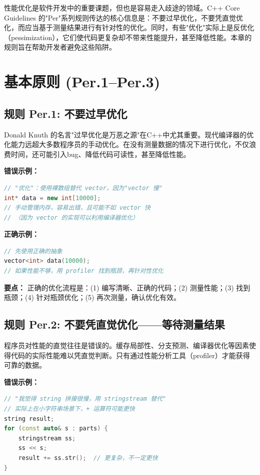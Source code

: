 性能优化是软件开发中的重要课题，但也是容易走入歧途的领域。C++ Core Guidelines 的"Per"系列规则传达的核心信息是：不要过早优化，不要凭直觉优化，而应当基于测量结果进行有针对性的优化。同时，有些"优化"实际上是反优化（pessimization），它们使代码更复杂却不带来性能提升，甚至降低性能。本章的规则旨在帮助开发者避免这些陷阱。

\section{基本原则 (Per.1--Per.3)}

\subsection*{\textbf{规则 Per.1:} 不要过早优化}

Donald Knuth 的名言"过早优化是万恶之源"在C++中尤其重要。现代编译器的优化能力远超大多数程序员的手动优化。在没有测量数据的情况下进行优化，不仅浪费时间，还可能引入bug、降低代码可读性，甚至降低性能。

\textbf{错误示例：}

\begin{lstlisting}[language=C++]
// "优化"：使用裸数组替代 vector，因为"vector 慢"
int* data = new int[10000];
// 手动管理内存，容易出错，且可能不如 vector 快
// （因为 vector 的实现可以利用编译器优化）
\end{lstlisting}

\textbf{正确示例：}

\begin{lstlisting}[language=C++]
// 先使用正确的抽象
vector<int> data(10000);
// 如果性能不够，用 profiler 找到瓶颈，再针对性优化
\end{lstlisting}

\textbf{要点：} 正确的优化流程是：(1) 编写清晰、正确的代码；(2) 测量性能；(3) 找到瓶颈；(4) 针对瓶颈优化；(5) 再次测量，确认优化有效。

\subsection*{\textbf{规则 Per.2:} 不要凭直觉优化——等待测量结果}

程序员对性能的直觉往往是错误的。缓存局部性、分支预测、编译器优化等因素使得代码的实际性能难以凭直觉判断。只有通过性能分析工具（profiler）才能获得可靠的数据。

\textbf{错误示例：}

\begin{lstlisting}[language=C++]
// "我觉得 string 拼接很慢，用 stringstream 替代"
// 实际上在小字符串场景下，+ 运算符可能更快
string result;
for (const auto& s : parts) {
    stringstream ss;
    ss << s;
    result += ss.str();  // 更复杂，不一定更快
}
\end{lstlisting}

